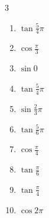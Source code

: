 \begin{multicols}{3}
\begin{enumerate}
  \item $\displaystyle \tan{\frac{5}{4}\pi}$
        \phantom{$\displaystyle =1$}

  \item $\displaystyle \cos{\frac{\pi}{3}}$

  \item $\displaystyle \sin{0}$
        \phantom{$\displaystyle =0$}

  \item $\displaystyle \tan{\frac{5}{4}\pi}$
        \phantom{$\displaystyle =1$}

  \item $\displaystyle \sin{\frac{2}{3}\pi}$

  \item $\displaystyle \tan{\frac{5}{6}\pi}$

  \item $\displaystyle \cos{\frac{\pi}{4}}$

  \item $\displaystyle \tan{\frac{\pi}{6}}$

  \item $\displaystyle \tan{\frac{\pi}{4}}$
        \phantom{$\displaystyle =1$}

  \item $\displaystyle \cos{2\pi}$
        \phantom{$\displaystyle =1$}

\end{enumerate}
\end{multicols}

\newpage
\resetdrill

